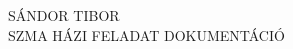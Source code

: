\begin{titlepage}
  \centering

  \;
  \vspace{20mm}

  {
    \LARGE
    \uppercase{Sándor Tibor} \\
    \uppercase{SZMA Házi Feladat dokumentáció}
  }
\end{titlepage}

